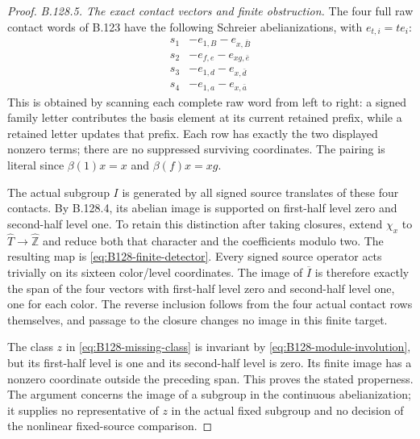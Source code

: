 \begin{proof}
\emph{B.128.5. The exact contact vectors and finite obstruction.}
The four full raw contact words of B.123 have the following
Schreier abelianizations, with $e_{t,i}=t e_i$:
\begin{equation}\label{eq:B128-contact-vectors}
\begin{array}{c|c}
 s_1&-e_{1,B}-e_{x,\bar B}\\
 s_2&-e_{f,e}-e_{xg,\bar e}\\
 s_3&-e_{1,d}-e_{x,\bar d}\\
 s_4&-e_{1,a}-e_{x,\bar a}
\end{array}
\end{equation}
This is obtained by scanning each complete raw word from left to
right: a signed family letter contributes the basis element at
its current retained prefix, while a retained letter updates that
prefix. Each row has exactly the two displayed nonzero terms;
there are no suppressed surviving coordinates. The pairing is
literal since $\beta(1)x=x$ and $\beta(f)x=xg$.

The actual subgroup $I$ is generated by all signed source
translates of these four contacts. By B.128.4, its abelian image
is supported on first-half level zero and second-half level one.
To retain this distinction after taking closures, extend
$\chi_x$ to $\widehat T\to\widehat{\mathbb Z}$ and reduce
both that character and the coefficients modulo two. The resulting
map is \eqref{eq:B128-finite-detector}. Every signed source
operator acts trivially on its sixteen color/level coordinates.
The image of $\overline I$ is therefore exactly the span of the
four vectors with first-half level zero and second-half level one,
one for each color. The reverse inclusion follows from the four
actual contact rows themselves, and passage to the closure changes
no image in this finite target.

The class $z$ in \eqref{eq:B128-missing-class} is invariant by
\eqref{eq:B128-module-involution}, but its first-half level is one
and its second-half level is zero. Its finite image has a nonzero
coordinate outside the preceding span. This proves the stated
properness. The argument concerns the image of a subgroup in the
continuous abelianization; it supplies no representative of $z$
in the actual fixed subgroup and no decision of the nonlinear
fixed-source comparison.
\end{proof}

